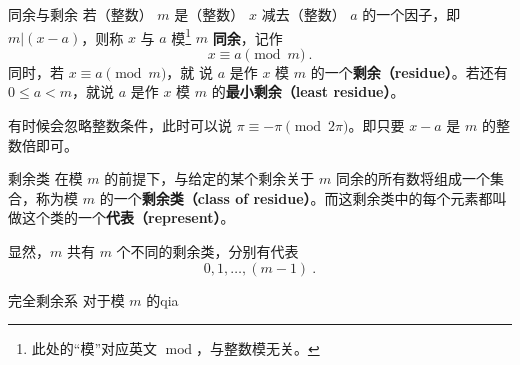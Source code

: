 

\begin{definition}{同余与剩余}
若（整数） $m$ 是（整数） $x$ 减去（整数） $a$ 的一个因子，即 $m | (x-a)$，则称 $x$ 与 $a$ 模\footnote{此处的“模”对应英文 $\operatorname{mod}$，与整数模无关。} $m$ \textbf{同余}，记作
\begin{equation}
x \equiv a \pmod m ~.
\end{equation}
同时，若 $x \equiv a \pmod m$，就 说 $a$ 是作 $x$ 模 $m$ 的一个\textbf{剩余（residue）}。若还有 $0 \le a < m$，就说 $a$ 是作 $x$ 模 $m$ 的\textbf{最小剩余（least residue）}。
\end{definition}
有时候会忽略整数条件，此时可以说 $\pi \equiv -\pi \pmod{2\pi}$。即只要 $x-a$ 是 $m$ 的整数倍即可。

\begin{definition}{剩余类}
在模 $m$ 的前提下，与给定的某个剩余关于 $m$ 同余的所有数将组成一个集合，称为模 $m$ 的一个\textbf{剩余类（class of residue）}。而这剩余类中的每个元素都叫做这个类的一个\textbf{代表（represent）}。
\end{definition}

\begin{corollary}{}
显然，$m$ 共有 $m$ 个不同的剩余类，分别有代表
\begin{equation}
0, 1, \dots, (m-1) ~.
\end{equation}
\end{corollary}
\begin{definition}{完全剩余系}
对于模 $m$ 的qia
\end{definition}

